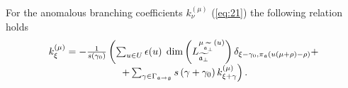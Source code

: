 \begin{theorem}
  For the anomalous branching coefficients $k^{(\mu)}_{\nu}$ (\ref{eq:21})
  the following relation holds
  \begin{equation}
    \label{recurrent-relation}
    \begin{array}{c}
      k_{\xi }^{\left( \mu \right) }=-\frac{1}{s\left( \gamma _{0}\right) }\left(
        \sum_{u\in U} \epsilon(u)\;
        \dim \left( L_{\widetilde{\mathfrak{a}_{\perp }}}^{\mu
        _{\widetilde{\mathfrak{a}_{\perp }}}\left( u\right) }\right)
        \delta_{\xi-\gamma_0,\pi_{\mathfrak{a}}(u(\mu+\rho)-\rho)}+ \right.\\
      \left.
        +\sum_{\gamma \in
          \Gamma _{\mathfrak{a} \rightarrow \mathfrak{g}}}s\left( \gamma +\gamma _{0}\right) k_{\xi
          +\gamma }^{\left( \mu \right) }\right).
    \end{array}
  \end{equation}
\end{theorem}
